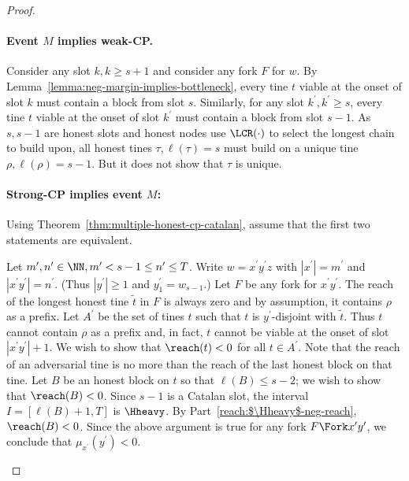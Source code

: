   \begin{proof}
    ~
    \paragraph{Event $M$ implies weak-CP.} 
    Consider any slot $k, k \geq s + 1$ and consider any fork $F$ for $w$.
    By Lemma~\ref{lemma:neg-margin-implies-bottleneck}, 
    every tine $t$ viable at the onset of slot $k$
    must contain a block from slot $s$. 
    Similarly, for any slot $k^\prime, k^\prime \geq s$,
    every tine $t$ viable at the onset of slot $k^\prime$
    must contain a block from slot $s - 1$. 
    As $s, s - 1$ are honest slots and 
    honest nodes use $\LCR(\cdot)$ to select the longest chain to build upon, 
    all honest tines $\tau, \ell(\tau) = s$ 
    must build on a unique tine $\rho, \ell(\rho) = s - 1$.
    {\color{red} But it does not show that $\tau$ is unique.}



    \paragraph{Strong-CP implies event $M$:} 
    Using Theorem~\ref{thm:multiple-honest-cp-catalan}, 
    assume that the first two statements are equivalent.

    \begin{description}[font=\normalfont\itshape\space]
      \item[Strong-CP implies Part (i) of event $M$.]
      Let $m^\prime, n^\prime \in \NN, m^\prime < s - 1 \leq n^\prime \leq T$.
      Write $w = x^\prime y^\prime z$ with $|x^\prime| = m^\prime$ and $|x^\prime y^\prime| = n^\prime$. 
      (Thus $|y^\prime| \geq 1$ and $y^\prime_1 = w_{s-1}$.)
      Let $F$ be any fork for $x^\prime y^\prime$. 
      The reach of the longest honest tine $\tilde{t}$ in $F$ is always zero 
      and by assumption, it contains $\rho$ as a prefix.
      Let $A^\prime$ be the set of tines $t$ such that 
      $t$ is $y^\prime$-disjoint with $\tilde{t}$. 
      Thus $t$ cannot contain $\rho$ as a prefix and, in fact, 
      $t$ cannot be viable at the onset of slot $|x^\prime y^\prime| + 1$.
      We wish to show that $\reach(t) < 0$ for all $t \in A^\prime$. 
      Note that the reach of an adversarial tine 
      is no more than the reach of the last honest block on that tine. 
      Let $B$ be an honest block on $t$ so that $\ell(B) \leq s - 2$; 
      we wish to show that $\reach(B) < 0$.
      Since $s - 1$ is a Catalan slot, the interval $I = [\ell(B) + 1, T]$ 
      is $\Hheavy$.
      By Part~\ref{reach:$\Hheavy$-neg-reach}, $\reach(B) < 0$.
      Since the above argument is true for any fork $F \Fork x^\prime y^\prime$, 
      we conclude that $\mu_{x^\prime}(y^\prime) < 0$. 



\end{description}
\end{proof}
